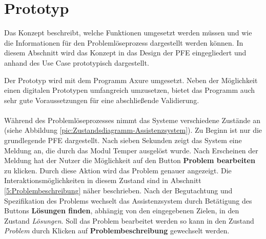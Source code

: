\chapter{Prototyp}
\label{Prototyp}
Das Konzept beschreibt, welche Funktionen umgesetzt werden müssen und wie die Informationen für den Problemlöseprozess dargestellt werden können. In diesem Abschnitt wird das Konzept in das Design der PFE \cite{}  eingegliedert und anhand des Use Case prototypisch dargestellt.

Der Prototyp wird mit dem Programm Axure \cite{axure}  umgesetzt. Neben der Möglichkeit einen digitalen Prototypen umfangreich umzusetzen, bietet das Programm auch sehr gute Voraussetzungen für eine abschließende Validierung.
\\ \\
Während des Problemlöseprozesses nimmt das Systeme verschiedene Zustände an (siehe Abbildung \ref{pic:Zustandsdiagramm-Assistenzsystem}). Zu Beginn ist nur die grundlegende PFE dargestellt. Nach sieben Sekunden zeigt das System eine Meldung an, die durch das Modul Temper ausgelöst wurde. Nach Erscheinen der Meldung hat der Nutzer die Möglichkeit auf den Button \textbf{Problem bearbeiten} zu klicken. Durch diese Aktion wird das Problem genauer angezeigt. Die Interaktionsmöglichkeiten in diesem Zustand sind in Abschnitt \ref{5:Problembeschreibung} näher beschrieben. Nach der Begutachtung und Spezifikation des Problems wechselt das Assistenzsystem durch Betätigung des Buttons\textbf{ Lösungen finden}, abhängig von den eingegebenen Zielen, in den Zustand \textit{Lösungen}. Soll das Problem bearbeitet werden so kann in den Zustand \textit{Problem} durch Klicken auf \textbf{Problembeschreibung} gewechselt werden. 

